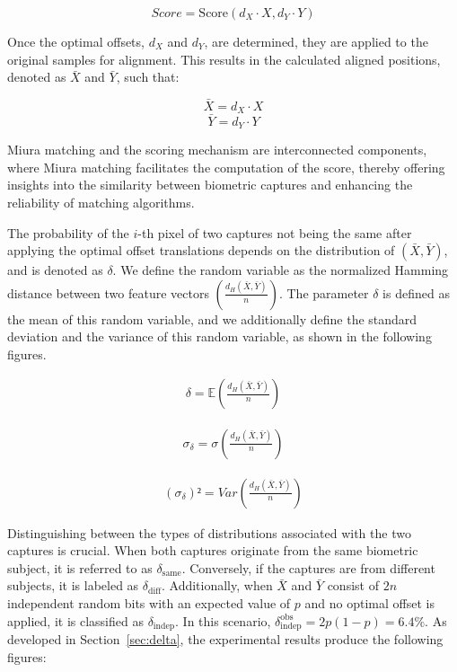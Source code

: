 \[Score = \text{Score}(d_X \cdot X, d_Y \cdot Y)\]

Once the optimal offsets, \(d_X\) and \(d_Y\), are determined, they are applied to the original samples for alignment. This results in the calculated aligned positions, denoted as \(\bar{X}\) and \(\bar{Y}\), such that:

\[\bar{X} = d_X \cdot X\]
\[\bar{Y} = d_Y \cdot Y\]

Miura matching and the scoring mechanism are interconnected components, where Miura matching facilitates the computation of the score, thereby offering insights into the similarity between biometric captures and enhancing the reliability of matching algorithms.

The probability of the \(i\)-th pixel of two captures not being the same after applying the optimal offset translations depends on the distribution of \((\bar{X}, \bar{Y})\), and is denoted as \(\delta\). We define the random variable as the normalized Hamming distance between two feature vectors \(\left( \frac{d_H(\bar{X}, \bar{Y})}{n} \right)\). The parameter \(\delta\) is defined as the mean of this random variable, and we additionally define the standard deviation and the variance of this random variable, as shown in the following figures.



\begin{equation} \label{eq:delta}
    \begin{aligned}
        \delta = \mathbb{E}\left( \frac{d_H(\bar{X}, \bar{Y})}{n} \right)
    \end{aligned}
\end{equation}

\begin{equation}
    \begin{aligned}
        \sigma_{\delta} = {\sigma}\left( \frac{d_H(\bar{X}, \bar{Y})}{n} \right)
    \end{aligned}
\end{equation}

\begin{equation}
    \begin{aligned}
        (\sigma_{\delta})² = {Var}\left( \frac{d_H(\bar{X}, \bar{Y})}{n} \right)
    \end{aligned}
\end{equation}

Distinguishing between the types of distributions associated with the two captures is crucial. When both captures originate from the same biometric subject, it is referred to as \(\delta_{\text{same}}\). Conversely, if the captures are from different subjects, it is labeled as \(\delta_{\text{diff}}\). Additionally, when \(\bar{X}\) and \(\bar{Y}\) consist of \(2n\) independent random bits with an expected value of \(p\) and no optimal offset is applied, it is classified as \(\delta_{\text{indep}}\). In this scenario, \(\delta_{\text{indep}}^{\text{obs}} = 2p(1-p) = 6.4\%\). As developed in Section~\ref{sec:delta}, the experimental results produce the following figures:

